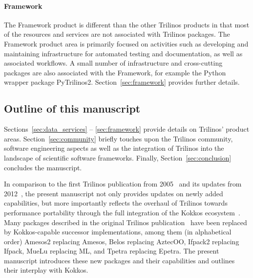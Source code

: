 \paragraph{Framework} The Framework product is different than the other Trilinos products in that most of the resources and services are not associated with Trilinos packages. The Framework product area is primarily focused on activities such as developing and maintaining infrastructure for automated testing and documentation, as well as associated workflows. A small number of infrastructure and cross-cutting packages are also associated with the Framework, for example the Python wrapper package PyTrilinos2. Section~\ref{sec:framework} provides further details.

\subsection{Outline of this manuscript}

Sections~\ref{sec:data_services} -- \ref{sec:framework} provide details on Trilinos' product areas.
Section~\ref{sec:community} briefly touches upon the Trilinos community, software engineering aspects as well as the integration of Trilinos into the landscape of scientific software frameworks.
Finally, Section~\ref{sec:conclusion} concludes the manuscript.

In comparison to the first Trilinos publication from 2005~\cite{Heroux2005a}
and its updates from 2012~\cite{Heroux2012,HerouxIntro2012part1,HerouxIntro2012part2,pawlowski2012automating,Oldfield2012,bochev2012,Boman2012,Baker2012,Kokkos2012,pawlowski2012automatingpart2,Spotz2012,Long2012,Morris2012,Howle2012,Bavier2012a,Gaidamour2012},
the present manuscript not only provides updates on newly added capabilities,
but more importantly reflects the overhaul of Trilinos towards performance portability through the full integration of the Kokkos ecosystem~\cite{edwards2014,trott2021kokkos,trott2022kokkos}.
Many packages described in the original Trilinos publication~\cite{Heroux2005a} have been replaced by Kokkos-capable successor implementations,
among them (in alphabetical order)
Amesos2 replacing Amesos,
Belos replacing AztecOO,
Ifpack2 replacing Ifpack,
MueLu replacing ML,
and Tpetra replacing Epetra.
The present manuscript introduces these new packages and their capabilities and outlines their interplay with Kokkos.
